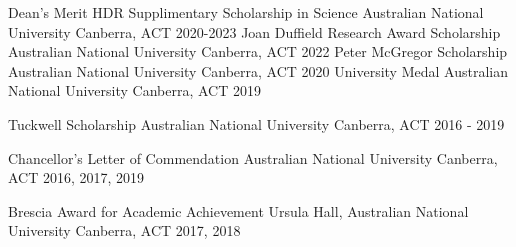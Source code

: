 



\begin{cvhonors}

  \cvhonor
    {Dean’s Merit HDR Supplimentary Scholarship in Science} %
    {Australian National University} %
    {Canberra, ACT} %
    {2020-2023} %
  \cvhonor
    {Joan Duffield Research Award Scholarship} %
    {Australian National University} %
    {Canberra, ACT} %
    {2022} %
  \cvhonor
    {Peter McGregor Scholarship} %
    {Australian National University} %
    {Canberra, ACT} %
    {2020} %
  \cvhonor
    {University Medal} %
    {Australian National University} %
    {Canberra, ACT} %
    {2019} %

  \cvhonor
    {Tuckwell Scholarship} %
    {Australian National University} %
    {Canberra, ACT} %
    {2016 - 2019} %

    
  \cvhonor
    {Chancellor's Letter of Commendation} %
    {Australian National University} %
    {Canberra, ACT} %
    {2016, 2017, 2019} %

  \cvhonor
    {Brescia Award for Academic Achievement} %
    {Ursula Hall, Australian National University} %
    {Canberra, ACT} %
    {2017, 2018} %


\end{cvhonors}
